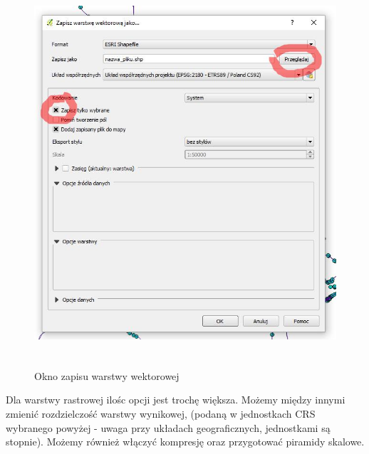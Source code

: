\documentclass[12pt,a4paper]{book}
\begin{document}
\begin{center}
\begin{figure}
\includegraphics[width=13cm,height=14.372cm]{002-zapisz-wektor.jpg}
\caption{Okno zapisu warstwy wektorowej}
\end{figure}
\end{center}
Dla warstwy rastrowej ilośc opcji jest trochę większa. Możemy między innymi zmienić rozdzielczość warstwy wynikowej, (podaną w jednostkach CRS wybranego powyżej - uwaga przy układach geograficznych, jednostkami są stopnie). Możemy również włączyć kompresję oraz przygotować piramidy skalowe.
\end{document}
